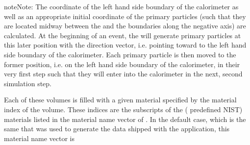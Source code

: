 \documentclass[letterpaper,10pt,english]{sphinxmanual}
\begin{document}
\begin{sphinxadmonition}{note}{Note:}
\sphinxAtStartPar
The \sphinxhyphen{}coordinate of the left hand side boundary of the calorimeter as well as an appropriate
initial \sphinxhyphen{}coordinate of the primary particles (such that they are located mid\sphinxhyphen{}way between the  and
the  boundaries along the negative \sphinxhyphen{}axis) are calculated. At the beginning of an event, the
{\hyperref[\detokenize{Simulation/SimulationCodeDoc:_CPPv416PrimaryGenerator}]{}} will generate primary particles at this later position with the \sphinxcode{\sphinxupquote{{[}1,0,0{]}}} direction vector,
i.e. pointing toward to the left hand side boundary of the calorimeter. Each primary particle is then moved to the former position,
i.e. on the left hand side boundary of the calorimeter, in their very first step such that they will enter into the calorimeter
in the next, second simulation step.
\end{sphinxadmonition}

\sphinxAtStartPar
Each of these volumes is filled with a given material specified by the material index of the volume. These indices are the subscripts of the
( predefined NIST) materials listed in the material name vector of {\hyperref[\detokenize{IntroAndInstall/components:the-hepemshow-datageneration-application-main}]{}}. In the default case, which is the same that
was used to generate the  data shipped with the application, this material name vector is
\def\sphinxLiteralBlockLabel{\label{\detokenize{IntroAndInstall/components:id3}}}
\begin{sphinxVerbatim}[commandchars=\\\{\}]
\end{sphinxVerbatim}
\end{document}
